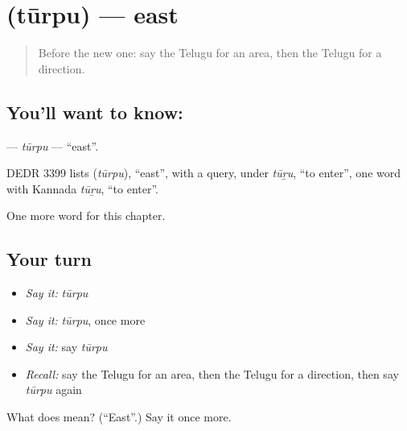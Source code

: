 \section[\texorpdfstring{\te{తూర్పు} (tūrpu)}{తూర్పు (tūrpu)}]{ (tūrpu) — east}

\label{lesson:TE-C254-turpu}



\begin{quote}
Before the new one: say the Telugu for an area, then the Telugu for a direction.
\end{quote}

\subsection*{You'll want to know: }
\textbf{} — \emph{tūrpu} — \textquotedblleft{}east\textquotedblright{}.

\begin{cousinweb}
DEDR 3399 lists \textbf{} (\emph{tūrpu}), \textquotedblleft{}east\textquotedblright{}, with a query, under \emph{tūṟu}, \textquotedblleft{}to enter\textquotedblright{}, one word with Kannada \emph{tūṟu}, \textquotedblleft{}to enter\textquotedblright{}.
\end{cousinweb}

\begin{grammarlens}[title={What you've built}]
One more word for this chapter.
\end{grammarlens}

\subsection*{Your turn}
\begin{itemize}
\raggedright
  \item \emph{Say it:} \emph{tūrpu}
  \item \emph{Say it:} \emph{tūrpu}, once more
  \item \emph{Say it:} say \emph{tūrpu}
  \item \emph{Recall:} say the Telugu for an area, then the Telugu for a direction, then say \emph{tūrpu} again
\end{itemize}

\begin{tcolorbox}[breakable,colback=teal!4,colframe=teal!35!black,title={Before you move on}]
What does  mean? (\textquotedblleft{}East\textquotedblright{}.) Say it once more.
\end{tcolorbox}
